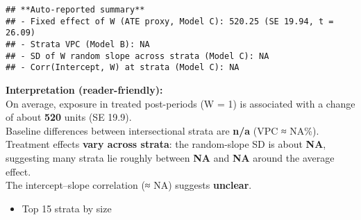\documentclass[
]{article}
\providecommand{\tightlist}{%
  \setlength{\itemsep}{0pt}\setlength{\parskip}{0pt}}
\begin{document}
\begin{verbatim}
## **Auto-reported summary**  
## - Fixed effect of W (ATE proxy, Model C): 520.25 (SE 19.94, t = 26.09)  
## - Strata VPC (Model B): NA  
## - SD of W random slope across strata (Model C): NA  
## - Corr(Intercept, W) at strata (Model C): NA
\end{verbatim}

\textbf{Interpretation (reader-friendly):}\\
On average, exposure in treated post-periods (W = 1) is associated with
a change of about \textbf{520} units (SE 19.9).\\
Baseline differences between intersectional strata are \textbf{n/a} (VPC
≈ NA\%).\\
Treatment effects \textbf{vary across strata}: the random-slope SD is
about \textbf{NA}, suggesting many strata lie roughly between
\textbf{NA} and \textbf{NA} around the average effect.\\
The intercept--slope correlation (≈ NA) suggests \textbf{unclear}.

\begin{itemize}
\tightlist
\item
  Top 15 strata by size
\end{itemize}
\end{document}
